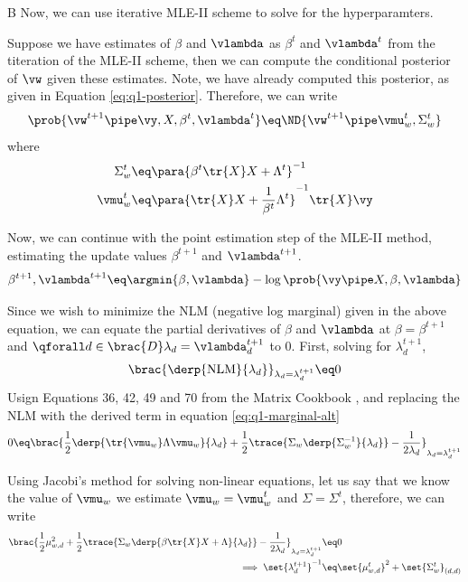 \documentclass{article}
\begin{document}
\begin{question}
\begin{qpart}{B}
		Now, we can use iterative MLE-II scheme to solve for the hyperparamters.

		Suppose we have estimates of $\beta$ and $\vlambda$ as $\beta^t$ and $\vlambda^t$ from the t\tth iteration of the MLE-II scheme, then we can compute the conditional posterior of $\vw$ given these estimates.
		Note, we have already computed this posterior, as given in Equation \ref{eq:q1-posterior}.
		Therefore, we can write
		\begin{align*}
			\prob{\vw^{t + 1} \pipe \vy, X, \beta^t, \vlambda^t}	\eq	\ND{\vw^{t + 1} \pipe \vmu_w^t, \Sigma_w^t}
		\end{align*}
		where
		\begin{align*}
			\Sigma_w^t	&\eq	\para{\beta^t \tr{X} X + \Lambda^t}^{-1} \\
			\vmu_w^t	&\eq	\para{\tr{X} X + \frac{1}{\beta^t} \Lambda^t}^{-1} \tr{X} \vy
		\end{align*}

		Now, we can continue with the point estimation step of the MLE-II method, \ie estimating the update values $\beta^{t + 1}$ and $\vlambda^{t + 1}$.
		\begin{align*}
			\beta^{t + 1}, \vlambda^{t + 1}	\eq	\argmin{\beta, \vlambda} - \log{\prob{\vy \pipe X, \beta, \vlambda}}
		\end{align*}

		Since we wish to minimize the NLM (negative log marginal) given in the above equation, we can equate the partial derivatives of $\beta$ and $\vlambda$ at $\beta = \beta^{t + 1}$ and $\qforall d \in \brac{D} \lambda_d = \vlambda_d^{t + 1}$ to 0.
		First, solving for $\lambda_d^{t + 1}$,
		\begin{align*}
			\brac{\derp{\text{NLM}}{\lambda_d}}_{\lambda_d = \lambda_d^{t + 1}}	\eq	0
		\end{align*}
		Usign Equations 36, 42, 49 and 70 from the Matrix Cookbook \cite{matrix-cookbook}, and replacing the NLM with the derived term in equation \ref{eq:q1-marginal-alt}
		\begin{align*}
			0	&\eq	\brac{\frac{1}{2} \derp{\tr{\vmu_w} \Lambda \vmu_w}{\lambda_d} +  \frac{1}{2} \trace{\Sigma_w \derp{\Sigma_w^{-1}}{\lambda_d}} - \frac{1}{2 \lambda_d}}_{\lambda_d = \lambda_d^{t + 1}} \\
		\end{align*}

		Using Jacobi's method for solving non-linear equations, let us say that we know the value of $\vmu_w$ \ie we estimate $\vmu_w = \vmu_w^t$ and $\Sigma = \Sigma^t$, therefore, we can write
		\begin{align*}
			\brac{\frac{1}{2} \mu_{w, d}^2 +  \frac{1}{2} \trace{\Sigma_w \derp{\beta \tr{X} X + \Lambda}{\lambda_d}} - \frac{1}{2 \lambda_d}}_{\lambda_d = \lambda_d^{t + 1}}	&\eq	0 \\
			\implies \set{\lambda_d^{t + 1}}^{-1}	&\eq	\set{\mu_{w, d}^t}^2 + \set{\Sigma_w^t}_{(d, d)}
		\end{align*}


\end{qpart}
\end{question}
\end{document}

